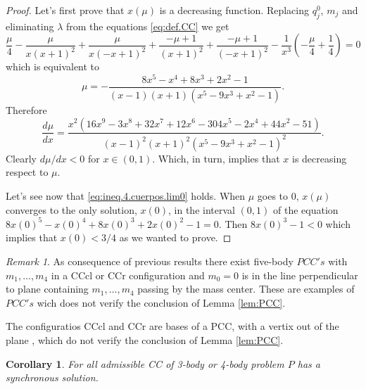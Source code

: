 \documentclass[twoside]{article}
\newtheorem{cor}[thm]{Corollary}
\theoremstyle{remark}
\newtheorem{comentario}{Remark}
\newcounter{example}
\begin{document}
\begin{proof}
Let's first prove that $x(\mu)$ is a decreasing function. Replacing $q_j^0$, $m_j$ and eliminating $\lambda$ from the equations \eqref{eq:def.CC} we get
\[\frac{\mu}{4} - \frac{\mu}{x \left(x + 1\right)^{2}} + \frac{\mu}{x \left(- x + 1\right)^{2}} + \frac{- \mu + 1}{\left(x + 1\right)^{2}} + \frac{- \mu + 1}{\left(- x + 1\right)^{2}} - \frac{1}{x^{3}} \left(- \frac{\mu}{4} + \frac{1}{4}\right) = 0\]
which is equivalent to
 \[\mu=- \frac{8 x^{5} - x^{4} + 8 x^{3} + 2 x^{2} - 1}{\left(x - 1\right) \left(x + 1\right) \left(x^{5} - 9 x^{3} + x^{2} - 1\right)}.\]
Therefore
\[
 \frac{d\mu}{dx}=\frac{x^{2} \left(16 x^{9} - 3 x^{8} + 32 x^{7} + 12 x^{6} - 304 x^{5} - 2 x^{4} + 44 x^{2} - 51\right)}{\left(x - 1\right)^{2} \left(x + 1\right)^{2} \left(x^{5} - 9 x^{3} + x^{2} - 1\right)^{2}}.
\]
Clearly $d\mu/dx<0$ for $x\in (0,1)$. Which, in turn, implies that $x$ is decreasing respect to $\mu$.





Let's see now that \eqref{eq:ineq.4.cuerpos.lim0} holds. When $\mu$ goes to $0$, $x(\mu)$ converges to the only solution, $x(0)$, in the interval $(0,1)$ of the equation $8 x(0)^{5} - x(0)^{4} + 8 x(0)^{3} + 2 x(0)^{2} - 1=0$.  Then  $ 8 x(0)^{3} -1< 0$ which implies that $x(0)<3/4$ as we wanted to prove.
\end{proof}


\begin{comentario}
As consequence of previous results there exist five-body $PCC's$ with $m_1,\ldots,m_4$  in a CCcl or CCr configuration and $m_0=0$ is in the  line perpendicular to plane containing $m_1,\ldots,m_4$ passing by the mass center. These are examples of $PCC's$ wich does not verify the conclusion of Lemma \ref{lem:PCC}.

 The configuratios CCcl and CCr are bases of a PCC, with a vertix out of the plane , which do not verify the conclusion of Lemma \ref{lem:PCC}.
\end{comentario}


\begin{cor}
For all  admissible CC of 3-body or 4-body  problem $P$ has a synchronous solution.
\end{cor}
\end{document}
